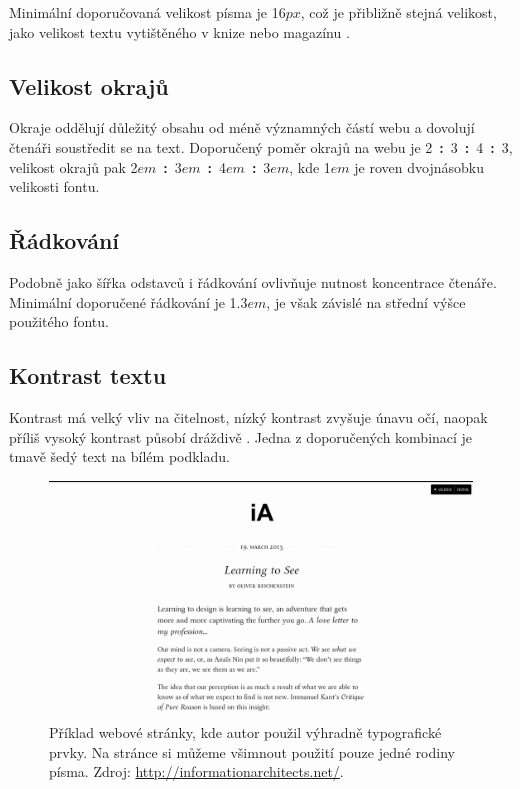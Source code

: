 Minimální doporučovaná velikost písma je 16$px$, což je přibližně stejná velikost, jako velikost textu vytištěného v knize nebo magazínu \cite{min-font-size}.

\subsection{Velikost okrajů}

Okraje oddělují důležitý obsahu od méně významných částí webu a dovolují čtenáři soustředit se na text. Doporučený poměr okrajů na webu je 2~\textbf{:}~3~\textbf{:}~4~\textbf{:}~3\footnotemark[1], velikost okrajů pak 2$em$~\textbf{:}~3$em$~\textbf{:}~4$em$~\textbf{:}~3$em$, kde 1$em$ je roven dvojnásobku velikosti fontu.


\subsection{Řádkování}

Podobně jako šířka odstavců i řádkování ovlivňuje nutnost koncentrace čtenáře. Minimální doporučené řádkování je 1.3$em$, je však závislé na střední výšce použitého fontu.

\subsection{Kontrast textu}

Kontrast má velký vliv na čitelnost, nízký kontrast zvyšuje únavu očí, naopak příliš vysoký kontrast působí dráždivě \cite{eye-strain}. Jedna z doporučených kombinací je tmavě šedý text na bílém podkladu.

\begin{figure}[htbp]
    \centering
    \includegraphics[width=\textwidth]{images/typography.png}
    \caption{Příklad webové stránky, kde autor použil výhradně typografické prvky. Na stránce si můžeme všimnout použití pouze jedné rodiny písma. Zdroj: \url{http://informationarchitects.net/}.}
    \label{fig:web-typography}
\end{figure}

